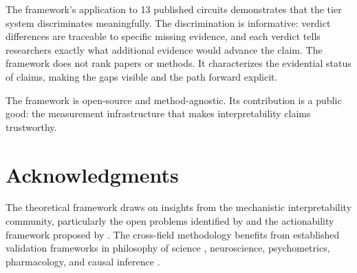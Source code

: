 \documentclass[10pt]{article}
\begin{document}
The framework's application to 13 published circuits demonstrates that the tier system discriminates meaningfully. The discrimination is informative: verdict differences are traceable to specific missing evidence, and each verdict tells researchers exactly what additional evidence would advance the claim. The framework does not rank papers or methods. It characterizes the evidential status of claims, making the gaps visible and the path forward explicit.

The framework is open-source and method-agnostic. Its contribution is a public good: the measurement infrastructure that makes interpretability claims trustworthy.

\section*{Acknowledgments}

The theoretical framework draws on insights from the mechanistic interpretability community, particularly the open problems identified by \citet{sharkey2026open} and the actionability framework proposed by \citet{orgad2026actionable}. The cross-field methodology benefits from established validation frameworks in philosophy of science \citep{mayo2018statistical, woodward2003making}, neuroscience, psychometrics, pharmacology, and causal inference \citep{pearl2009causality, spirtes2000causation}.


\end{document}
